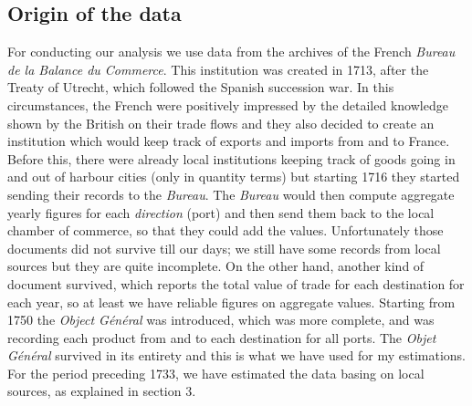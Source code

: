 \documentclass[12pt,a4paper,notitlepage,english]{article}
\begin{document}
\subsection{Origin of the data}
For conducting our analysis we use data from the archives of the French \textit{Bureau de la Balance du Commerce}. This institution was created in 1713, after the Treaty of Utrecht, which followed the Spanish succession war. In this circumstances, the French were positively impressed by the detailed knowledge shown by the British on their trade flows and they also decided to create an institution which would keep track of exports and imports from and to France. Before this, there were already local institutions keeping track of goods going in and out of harbour cities (only in quantity terms) but starting 1716 they started sending their records to the \textit{Bureau}. The \textit{Bureau} would then compute aggregate yearly figures for each \textit{direction} (port) and then send them back to the local chamber of commerce, so that they could add the values. Unfortunately those documents did not survive till our days; we still have some records from local sources but they are quite incomplete. On the other hand, another kind of document survived, which reports the total value of trade for each destination for each year, so at least we have reliable figures on aggregate values. Starting from 1750 the \textit{Object Général} was introduced, which was more complete, and was recording each product from and to each destination for all ports. The \textit{Objet Général} survived in its entirety and this is what we have used for my estimations. For the period preceding 1733, we have estimated the data basing on local sources, as explained in section 3. \\
\end{document}
